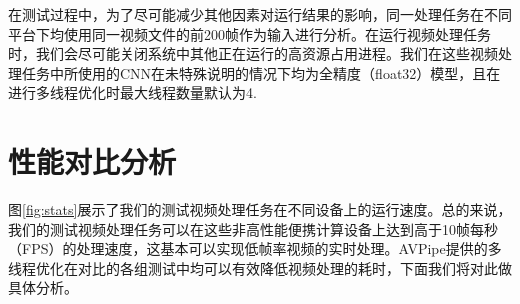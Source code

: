 在测试过程中，为了尽可能减少其他因素对运行结果的影响，同一处理任务在不同平台下均使用同一视频文件的前200帧作为输入进行分析。在运行视频处理任务时，我们会尽可能关闭系统中其他正在运行的高资源占用进程。我们在这些视频处理任务中所使用的CNN在未特殊说明的情况下均为全精度（float32）模型，且在进行多线程优化时最大线程数量默认为4.

\section{性能对比分析}

图\ref{fig:stats}展示了我们的测试视频处理任务在不同设备上的运行速度。总的来说，我们的测试视频处理任务可以在这些非高性能便携计算设备上达到高于10帧每秒（FPS）的处理速度，这基本可以实现低帧率视频的实时处理。AVPipe提供的多线程优化在对比的各组测试中均可以有效降低视频处理的耗时，下面我们将对此做具体分析。\par

